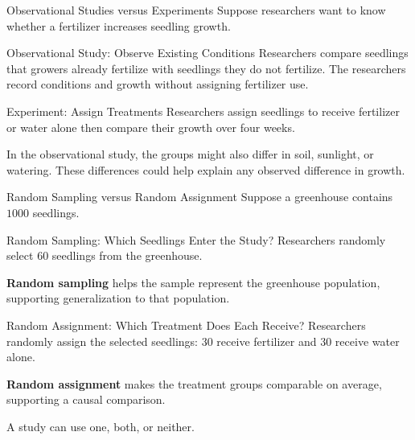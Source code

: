 \documentclass[aspectratio=169]{beamer}
\begin{document}
\begin{frame}{Observational Studies versus Experiments}
Suppose researchers want to know whether a fertilizer increases seedling growth.

\begin{block}{Observational Study: Observe Existing Conditions}
Researchers compare seedlings that growers already fertilize with seedlings they do not fertilize. The researchers record conditions and growth without assigning fertilizer use.
\end{block}

\begin{block}{Experiment: Assign Treatments}
Researchers assign seedlings to receive fertilizer or water alone then compare their growth over four weeks.
\end{block}

\small
In the observational study, the groups might also differ in soil, sunlight, or watering. These differences could help explain any observed difference in growth.
\end{frame}

\begin{frame}{Random Sampling versus Random Assignment}
Suppose a greenhouse contains $1000$ seedlings.

\begin{block}{Random Sampling: Which Seedlings Enter the Study?}
Researchers randomly select $60$ seedlings from the greenhouse. 

\textbf{Random sampling} helps the sample represent the greenhouse population, supporting generalization to that population.
\end{block}

\begin{block}{Random Assignment: Which Treatment Does Each Receive?}
Researchers randomly assign the selected seedlings: $30$ receive fertilizer and $30$ receive water alone.
 
\textbf{Random assignment} makes the treatment groups comparable on average, supporting a causal comparison.
\end{block}

\small
A study can use one, both, or neither. 
\end{frame}
\end{document}
